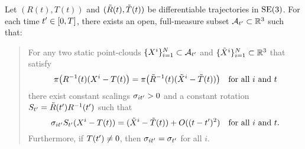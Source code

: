 \begin{lemma}\label{claim-one}
Let $(R(t),T(t))$ and $(\tilde{R}(t),\tilde{T}(t))$ be differentiable trajectories in $\operatorname{SE}(3)$.
For each time $t^{\prime}\in[0,T]$, there exists an open, full-measure subset $\mathcal{A}_{t^{\prime}}\subset\mathbb{R}^3$
such that:
\begin{quote}
For any two static point-clouds $\{X^i\}_{i=1}^N\subset\mathcal{A}_{t^{\prime}}$ and $\{\tilde{X}^i\}_{i=1}^N\subset\mathbb{R}^3$ that satisfy
\begin{equation}
\pi\bigl(R^{-1}(t) (X^i-T(t)\bigr) = \pi\bigl(\tilde{R}^{-1}(t) (\tilde{X}^i-\tilde{T}(t))\bigr) 
\quad\text{for all $i$ and $t$}
\label{prob}
\end{equation}
there exist constant scalings $\sigma_{it^{\prime}}>0$ and a constant rotation $S_{t^{\prime}}=\tilde{R}({t^{\prime}})R^{-1}({t^{\prime}})$ such that
$$ \sigma_{it^{\prime}} S_{t^{\prime}} (X^i - T(t)) = (\tilde{X}^i-\tilde{T}(t)) + O((t-t^{\prime})^2)
\quad\text{for all $i$ and $t$}.$$
Furthermore, if $T(t^{\prime})\neq0$, then $\sigma_{it^{\prime}}=\sigma_{t^{\prime}}$ for all $i$.
\end{quote}
\end{lemma}
